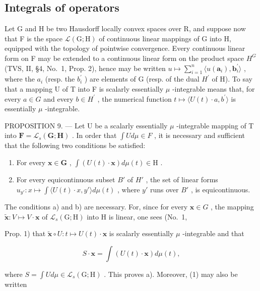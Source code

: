 \subsection{Integrals of operators}

Let G and H be two Hausdorff locally convex spaces over R, and suppose now that F is the space \(\mathcal{L}(\mathrm{G};\mathrm{H})\) of continuous linear mappings of G into H, equipped with the topology of pointwise convergence. Every continuous linear form on F may be extended to a continuous linear form on the product space \(H^{G}\) (TVS, II, §4, No.~1, Prop. 2), hence may be written \(u \mapsto \sum_{i=1}^{n} \langle u(\mathbf{a}_{i}), \mathbf{b}_{i}^{\prime} \rangle\) , where the \(a_{i}\) (resp. the \(b_{i}^{\prime}\) ) are elements of G (resp. of the dual \(H^{\prime}\) of H). To say that a mapping U of T into F is scalarly essentially \(\mu\) -integrable means that, for every \(a \in G\) and every \(b \in H^{\prime}\) , the numerical function \(t \mapsto \langle U(t) \cdot a, b^{\prime} \rangle\) is essentially \(\mu\) -integrable.

PROPOSITION 9. --- Let U be a scalarly essentially \(\mu\) -integrable mapping of T into \(\mathbf{F} = \mathcal{L}_{s}(\mathbf{G}; \mathbf{H})\) . In order that \(\int U d\mu \in F\) , it is necessary and sufficient that the following two conditions be satisfied:

\begin{enumerate}
\def\labelenumi{\alph{enumi})}
\item
  For every \(\mathbf{x} \in \mathbf{G}\) , \(\int (U(t) \cdot \mathbf{x}) d\mu(t) \in \mathrm{H}\) .
\item
  For every equicontinuous subset \(B'\) of \(H'\) , the set of linear forms \(u_{y'} : x \mapsto \int \langle U(t) \cdot x, y' \rangle d\mu(t)\) , where \(y'\) runs over \(B'\) , is equicontinuous.
\end{enumerate}

The conditions a) and b) are necessary. For, since for every \(\mathbf{x} \in G\) , the mapping \(\widetilde{\mathbf{x}}: V \mapsto V \cdot \mathbf{x}\) of \(\mathcal{L}_s(\mathrm{G};\mathrm{H})\) into H is linear, one sees (No.~1,

Prop. 1) that \(\widetilde{\mathbf{x}}\circ U:t\mapsto U(t)\cdot \mathbf{x}\) is scalarly essentially \(\mu\) -integrable and that

\[
S \cdot \mathbf {x} = \int (U (t) \cdot \mathbf {x}) d \mu (t),\tag{1}
\]

where \(S = \int U d\mu \in \mathcal{L}_s(\mathrm{G};\mathrm{H})\) . This proves a). Moreover, (1) may also be written

